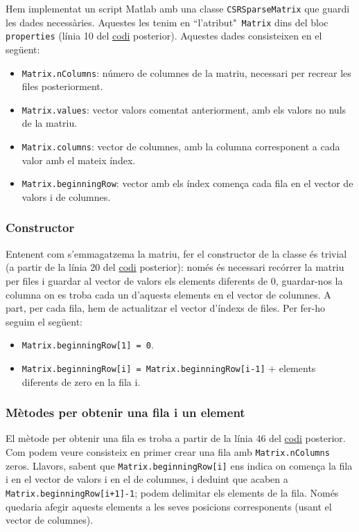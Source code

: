 \documentclass[11pt,a4paper,twoside]{report}
\begin{document}
	Hem implementat un script Matlab amb una classe \texttt{CSRSparseMatrix} que guardi les dades necessàries. Aquestes les tenim en ``l'atribut"\texttt{ Matrix} dins del bloc \texttt{properties} (línia 10 del \hyperref[sec:codi1]{codi} posterior). Aquestes dades consisteixen en el següent:	
	\begin{itemize}
	\item  \texttt{Matrix.nColumns}: número de columnes de la matriu, necessari per recrear les files posteriorment.
	\item  \texttt{Matrix.values}: vector valors comentat anteriorment, amb els valors no nuls de la matriu.
	\item  \texttt{Matrix.columns}: vector de columnes, amb la columna corresponent a cada valor amb el mateix índex.
	\item  \texttt{Matrix.beginningRow}: vector amb els índex comença cada fila en el vector de valors i de columnes.
	\end{itemize}
	
	\subsubsection{Constructor}
	Entenent com s'emmagatzema la matriu, fer el constructor de la classe és trivial (a partir de la línia 20 del \hyperref[sec:codi1]{codi} posterior): només és necessari recórrer la matriu per files i guardar al vector de valors els elements diferents de 0, guardar-nos la columna on es troba cada un d'aquests elements en el vector de columnes. A part, per cada fila, hem de actualitzar el vector d'índexs de files. Per fer-ho seguim el següent:
	\begin{itemize}
	\item \texttt{Matrix.beginningRow[1] = 0}.
	\item \texttt{Matrix.beginningRow[i] = Matrix.beginningRow[i-1]} + elements diferents de zero en la fila i.
	\end{itemize}
	
	\subsubsection{Mètodes per obtenir una fila i un element}
	
	El mètode per obtenir una fila es troba a partir de la línia 46 del \hyperref[sec:codi1]{codi} posterior. Com podem veure consisteix en primer crear una fila amb \texttt{Matrix.nColumns} zeros.
	Llavors, sabent que \texttt{Matrix.beginningRow[i]} ens indica on comença la fila i en el vector de valors i en el de columnes, i deduint que acaben a \texttt{Matrix.beginningRow[i+1]-1}; podem delimitar els elements de la fila. Només quedaria afegir aquests elements a les seves posicions corresponents (usant el vector de columnes).
	
\end{document}

